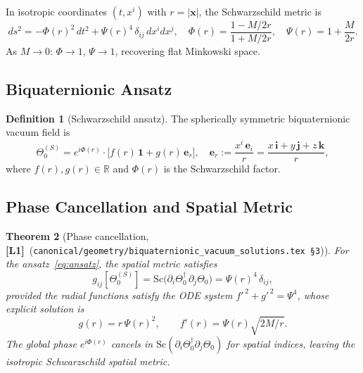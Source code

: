 \documentclass[11pt,a4paper]{article}
\newtheorem{theorem}{Theorem}[section]
\theoremstyle{definition}
\newtheorem{definition}[theorem]{Definition}
\theoremstyle{remark}
\newcommand{\Lone}{\textbf{[L1]}}
\begin{document}
In isotropic coordinates $(t,x^i)$ with $r = |\mathbf{x}|$, the
Schwarzschild metric is
\begin{equation}
  ds^2 = -\Phi(r)^2\,dt^2 + \Psi(r)^4\,\delta_{ij}\,dx^i dx^j,
  \quad
  \Phi(r) = \frac{1-M/2r}{1+M/2r},\quad
  \Psi(r) = 1 + \frac{M}{2r}.
  \label{eq:schwarzschild_metric}
\end{equation}
As $M \to 0$: $\Phi \to 1$, $\Psi \to 1$, recovering flat Minkowski space.

\subsection{Biquaternionic Ansatz}

\begin{definition}[Schwarzschild ansatz]
\label{def:schwarzschild_ansatz}
The spherically symmetric biquaternionic vacuum field is
\begin{equation}
  \Theta_0^{(S)} = e^{i\Phi(r)}\cdot\bigl[f(r)\,\mathbf{1}
    + g(r)\,\boldsymbol{e}_r\bigr],
  \quad
  \boldsymbol{e}_r := \frac{x^i\,\mathbf{e}_i}{r}
    = \frac{x\,\mathbf{i} + y\,\mathbf{j} + z\,\mathbf{k}}{r},
  \label{eq:ansatz}
\end{equation}
where $f(r), g(r) \in \mathbb{R}$ and $\Phi(r)$ is the Schwarzschild factor.
\end{definition}

\subsection{Phase Cancellation and Spatial Metric}

\begin{theorem}[Phase cancellation, \Lone\ {\normalfont(}\texttt{canonical/geometry/biquaternionic\_vacuum\_solutions.tex~§3}{\normalfont)}]
\label{thm:phase_cancel}
For the ansatz~\eqref{eq:ansatz}, the spatial metric satisfies
\begin{equation}
  g_{ij}[\Theta_0^{(S)}]
  = \mathrm{Sc}\!\bigl(\partial_i\Theta_0^\dagger\,\partial_j\Theta_0\bigr)
  = \Psi(r)^4\,\delta_{ij},
  \label{eq:spatial_metric}
\end{equation}
provided the radial functions satisfy the ODE system
$f'^{\,2} + g'^{\,2} = \Psi^4$,
whose explicit solution is
\begin{equation}
  g(r) = r\,\Psi(r)^2, \qquad
  f'(r) = \Psi(r)\sqrt{2M/r}.
  \label{eq:ode_solution}
\end{equation}
The global phase $e^{i\Phi(r)}$ cancels in $\mathrm{Sc}(\partial_i\Theta^\dagger_0
\partial_j\Theta_0)$ for spatial indices, leaving the isotropic Schwarzschild
spatial metric.
\end{theorem}
\end{document}
